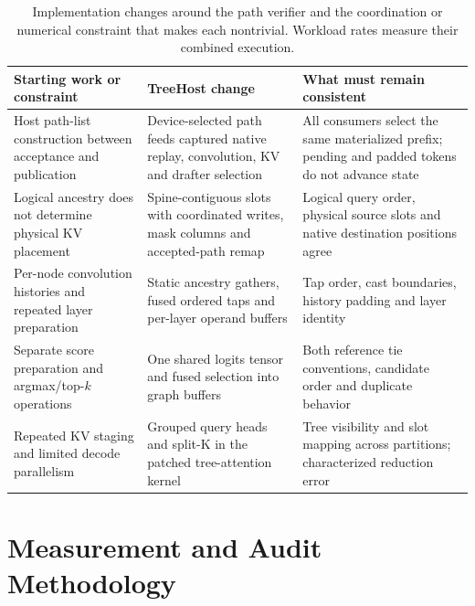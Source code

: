 \documentclass[sigconf,anonymous,review]{acmart}
\newcommand{\sys}{TreeHost}
\begin{document}
\begin{table}[t]
\caption{Implementation changes around the path verifier and the coordination or numerical constraint that makes each nontrivial. Workload rates measure their combined execution.}
\label{tab:optimization-map}
\centering\footnotesize
\renewcommand{\arraystretch}{1.1}
\begin{tabularx}{\textwidth}{@{}>{\raggedright\arraybackslash}p{}YY@{}}
\toprule
Starting work or constraint & \sys{} change & What must remain consistent \\
\midrule
Host path-list construction between acceptance and publication & Device-selected path feeds captured native replay, convolution, KV and drafter selection & All consumers select the same materialized prefix; pending and padded tokens do not advance state \\
Logical ancestry does not determine physical KV placement & Spine-contiguous slots with coordinated writes, mask columns and accepted-path remap & Logical query order, physical source slots and native destination positions agree \\
Per-node convolution histories and repeated layer preparation & Static ancestry gathers, fused ordered taps and per-layer operand buffers & Tap order, cast boundaries, history padding and layer identity \\
Separate score preparation and argmax/top-$k$ operations & One shared logits tensor and fused selection into graph buffers & Both reference tie conventions, candidate order and duplicate behavior \\
Repeated KV staging and limited decode parallelism & Grouped query heads and split-K in the patched tree-attention kernel & Tree visibility and slot mapping across partitions; characterized reduction error \\
\bottomrule
\end{tabularx}
\end{table}

\section{Measurement and Audit Methodology}
\label{sec:method}
\end{document}
